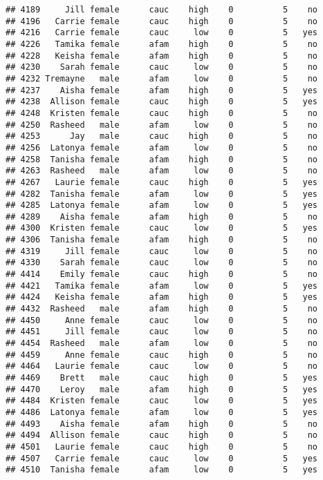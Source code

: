 \documentclass[
]{article}
\begin{document}
\begin{verbatim}
## 4189     Jill female      cauc    high    0          5    no
## 4196   Carrie female      cauc    high    0          5    no
## 4216   Carrie female      cauc     low    0          5   yes
## 4226   Tamika female      afam    high    0          5    no
## 4228   Keisha female      afam    high    0          5    no
## 4230    Sarah female      cauc     low    0          5    no
## 4232 Tremayne   male      afam     low    0          5    no
## 4237    Aisha female      afam    high    0          5   yes
## 4238  Allison female      cauc    high    0          5   yes
## 4248  Kristen female      cauc    high    0          5    no
## 4250  Rasheed   male      afam     low    0          5    no
## 4253      Jay   male      cauc    high    0          5    no
## 4256  Latonya female      afam     low    0          5    no
## 4258  Tanisha female      afam    high    0          5    no
## 4263  Rasheed   male      afam     low    0          5    no
## 4267   Laurie female      cauc    high    0          5   yes
## 4282  Tanisha female      afam     low    0          5   yes
## 4285  Latonya female      afam     low    0          5   yes
## 4289    Aisha female      afam    high    0          5    no
## 4300  Kristen female      cauc     low    0          5   yes
## 4306  Tanisha female      afam    high    0          5    no
## 4319     Jill female      cauc     low    0          5    no
## 4330    Sarah female      cauc     low    0          5    no
## 4414    Emily female      cauc    high    0          5    no
## 4421   Tamika female      afam     low    0          5   yes
## 4424   Keisha female      afam    high    0          5   yes
## 4432  Rasheed   male      afam    high    0          5    no
## 4450     Anne female      cauc     low    0          5    no
## 4451     Jill female      cauc     low    0          5    no
## 4454  Rasheed   male      afam     low    0          5    no
## 4459     Anne female      cauc    high    0          5    no
## 4464   Laurie female      cauc     low    0          5    no
## 4469    Brett   male      cauc    high    0          5   yes
## 4470    Leroy   male      afam    high    0          5   yes
## 4484  Kristen female      cauc     low    0          5   yes
## 4486  Latonya female      afam     low    0          5   yes
## 4493    Aisha female      afam    high    0          5    no
## 4494  Allison female      cauc    high    0          5    no
## 4501   Laurie female      cauc    high    0          5    no
## 4507   Carrie female      cauc     low    0          5   yes
## 4510  Tanisha female      afam     low    0          5   yes

\end{verbatim}
\end{document}
